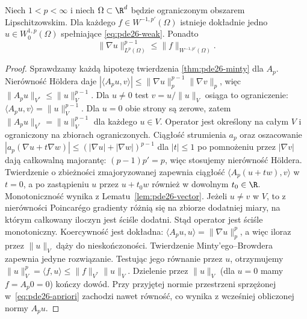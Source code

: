 \begin{twierdzenie}\label{thm:pde26-plap}
Niech $1<p<\infty$ i niech $\Omega\subset\R^d$ będzie
ograniczonym obszarem Lipschitzowskim. Dla każdego
$f\in W^{-1,p'}(\Omega)$ istnieje dokładnie jedno
$u\in W_0^{1,p}(\Omega)$ spełniające
\eqref{eq:pde26-weak}. Ponadto
\begin{equation}\label{eq:pde26-apriori}
 \|\nabla u\|_{L^p(\Omega)}^{p-1}
 \le\|f\|_{W^{-1,p'}(\Omega)}.
\end{equation}
\end{twierdzenie}
\begin{proof}
Sprawdzamy każdą hipotezę twierdzenia
\ref{thm:pde26-minty} dla $A_p$.
Nierówność Höldera daje
$|\langle A_pu,v\rangle|\le
\|\nabla u\|_p^{p-1}\|\nabla v\|_p$, więc
$\|A_pu\|_{V^*}\le\|u\|_V^{p-1}$.
Dla $u\ne0$ test $v=u/\|u\|_V$ osiąga to ograniczenie:
$\langle A_pu,v\rangle=\|u\|_V^{p-1}$.
Dla $u=0$ obie strony są zerowe, zatem
$\|A_pu\|_{V^*}=\|u\|_V^{p-1}$ dla każdego $u\in V$.
Operator jest określony na całym $V$ i ograniczony
na zbiorach ograniczonych. Ciągłość strumienia $a_p$ oraz
oszacowanie
$|a_p(\nabla u+t\nabla w)|\le
(|\nabla u|+|\nabla w|)^{p-1}$ dla $|t|\le1$
po pomnożeniu przez $|\nabla v|$ dają całkowalną
majorantę: $(p-1)p'=p$, więc stosujemy nierówność
Höldera. Twierdzenie o zbieżności zmajoryzowanej
zapewnia ciągłość $\langle A_p(u+tw),v\rangle$
w $t=0$, a po zastąpieniu $u$ przez $u+t_0w$
również w dowolnym $t_0\in\R$.
Monotoniczność wynika z Lematu~\ref{lem:pde26-vector}.
Jeżeli $u\ne v$ w $V$, to z nierówności Poincarégo
gradienty różnią się na zbiorze dodatniej miary,
na którym całkowany iloczyn jest ściśle dodatni.
Stąd operator jest ściśle monotoniczny.
Koercywność jest dokładna:
$\langle A_pu,u\rangle=\|\nabla u\|_p^p$,
a więc iloraz przez $\|u\|_V$ dąży do nieskończoności.
Twierdzenie Minty'ego--Browdera zapewnia jedyne rozwiązanie.
Testując jego równanie przez $u$, otrzymujemy
$\|u\|_V^p=\langle f,u\rangle\le
\|f\|_{V^*}\|u\|_V$. Dzielenie przez $\|u\|_V$
(dla $u=0$ mamy $f=A_p0=0$) kończy dowód.
Przy przyjętej normie przestrzeni sprzężonej
w~\eqref{eq:pde26-apriori} zachodzi nawet równość,
co wynika z wcześniej obliczonej normy $A_pu$.
\end{proof}

